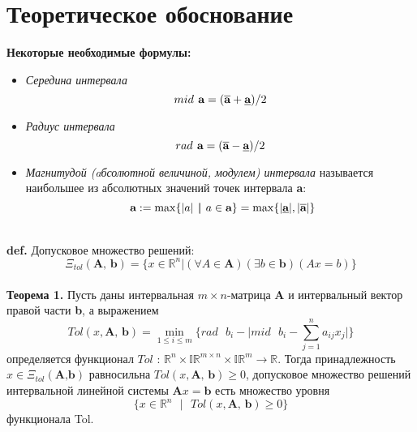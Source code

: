 \documentclass[a4paper,12pt]{article}
\begin{document}
\section{Теоретическое обоснование}
\textbf{Некоторые необходимые формулы:}
\begin{itemize}
    \item \textit{Середина интервала}
    \begin{equation*}
 mid \textbf{ a}=(\overline{\textbf{a}}+\textbf{\underline{a}})/2
 \end{equation*}
    \item \textit{Радиус интервала}
    \begin{equation*}
 rad \textbf{ a}=(\overline{\textbf{a}}-\textbf{\underline{a}})/2
 \end{equation*}
    \item \textit{Магнитудой (aбсолютной величиной, модулем) интервала} называется наибольшее из абсолютных значений точек интервала \textbf{a}:
    \begin{equation*}
 \textbf{ a}:=\max\{|a|\textbf{ | } a \in \textbf{a}\}=\max\{|\textbf{\underline{a}}|, |\overline{\textbf{a}}|\}
 \end{equation*}
\end{itemize}
\\
\textbf{def.} Допусковое множество решений:
\begin{equation}\tag{1.1}
 \Xi_{tol}(\textbf{A, b})=\{x \in \mathbb{R}^n|(\forall A \in \textbf{A})(\exists b \in \textbf{b})(Ax=b)\}
 \end{equation}
\\
\textbf{Теорема 1.} Пусть даны интервальная $m \times n$-матрица \textbf{A} и интервальный вектор правой части \textbf{b}, а выражением
\begin{equation}\tag{1.2}
 Tol(x, \textbf{A, b})=\min_{1\leq i\leq m}\lbrace rad \text{ }b_i - \lvert mid \text{ }b_i - \sum_{j=1}^{n}a_{ij}x_j \rvert \rbrace 
 \end{equation}
определяется функционал $Tol$ : $\mathbb{R}^n\times\mathbb{IR}^{m\times n}\times \mathbb{IR}^m\rightarrow \mathbb{R}$. Тогда принадлежность $x \in \Xi_{tol}(\textbf{A,b})$ равносильна $Tol(x,\textbf{A, b}) \geq 0$, допусковое
множество решений интервальной линейной системы $\textbf{A}x=\textbf{b}$ есть множество уровня
\begin{equation*}
 \{x \in \mathbb{R}^n \textbf{ }|\textbf{ } Tol(x,\textbf{A, b}) \geq 0\}
 \end{equation*}
функционала Tol.
\\
\end{document}
